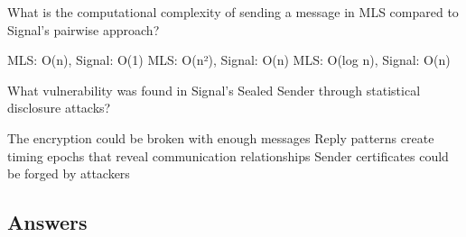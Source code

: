 \documentclass[10pt,a4paper,american]{exam}
\begin{document}
\begin{questions}
	\question What is the computational complexity of sending a message in MLS compared to Signal's pairwise approach?
	\begin{randomizechoices}
		\choice MLS: O(n), Signal: O(1)
		\choice MLS: O(n²), Signal: O(n)
		\CorrectChoice MLS: O(log n), Signal: O(n)
	\end{randomizechoices}

	\question What vulnerability was found in Signal's Sealed Sender through statistical disclosure attacks?
	\begin{randomizechoices}
		\choice The encryption could be broken with enough messages
		\CorrectChoice Reply patterns create timing epochs that reveal communication relationships
		\choice Sender certificates could be forged by attackers
	\end{randomizechoices}

\end{questions}

\clearpage

\subsection*{Answers}
\printkeytable
\end{document}
